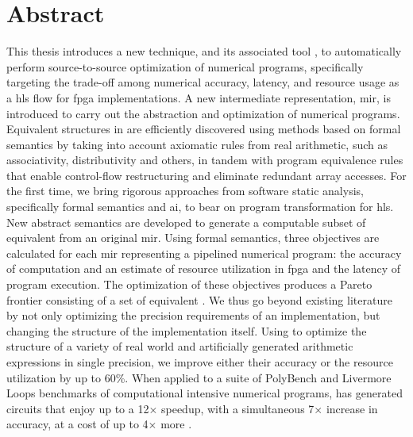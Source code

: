 \chapter*{Abstract}
\label{sec:abstract}
\vspace*{-10mm}

This thesis introduces a new technique, and its associated tool \soap, to
automatically perform source-to-source optimization of numerical programs,
specifically targeting the trade-off among numerical accuracy, latency, and
resource usage as a \acrlong{hls} flow for \acrshort{fpga} implementations.  A
new intermediate representation, \acrshort{mir}, is introduced to carry out
the abstraction and optimization of numerical programs.  Equivalent structures
in  are efficiently discovered using methods based on formal
semantics by taking into account axiomatic rules from real arithmetic, such as
associativity, distributivity and others, in tandem with program equivalence
rules that enable control-flow restructuring and eliminate redundant array
accesses.  For the first time, we bring rigorous approaches from software
static analysis, specifically formal semantics and \acrlong{ai}, to bear
on program transformation for \acrlong{hls}.  New abstract semantics are
developed to generate a computable subset of equivalent 
from an original \acrshort{mir}.  Using formal semantics, three objectives
are calculated for each \acrshort{mir} representing a pipelined numerical
program: the accuracy of computation and an estimate of resource utilization
in \acrshort{fpga} and the latency of program execution.  The optimization of
these objectives produces a Pareto frontier consisting of a set of equivalent
.  We thus go beyond existing literature by not only optimizing
the precision requirements of an implementation, but changing the structure
of the implementation itself.  Using \soap{} to optimize the structure of a
variety of real world and artificially generated arithmetic expressions in
single precision, we improve either their accuracy or the resource utilization
by up to 60\%.  When applied to a suite of PolyBench and Livermore Loops
benchmarks of computational intensive numerical programs, \soap{} has generated
circuits that enjoy up to a 12$\times$ speedup, with a simultaneous 7$\times$
increase in accuracy, at a cost of up to 4$\times$ more .
